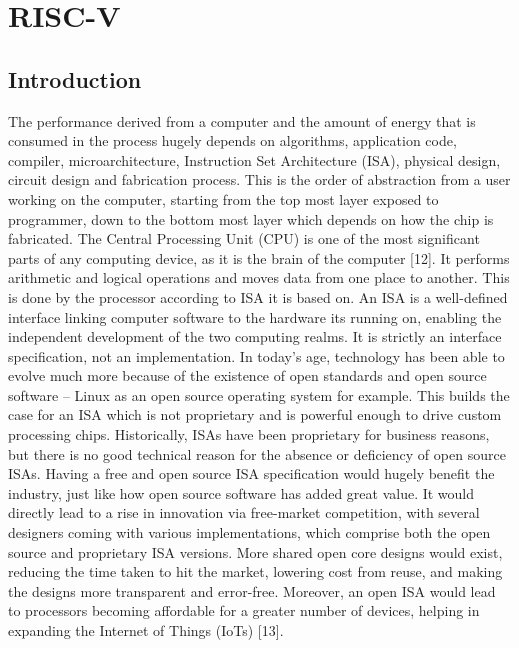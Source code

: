 \chapter{RISC-V}
\label{ch6_riscv}

\section{Introduction}
 \label{sect6_1}
 
The performance derived from a computer and the amount of energy that is consumed in the process hugely depends on algorithms, application code, compiler, microarchitecture, Instruction Set Architecture (ISA), physical design, circuit design and fabrication process. This is the order of abstraction from a user working on the computer, starting from the top most layer exposed to programmer, down to the bottom most layer which depends on how the chip is fabricated. \newline\newline
The Central Processing Unit (CPU) is one of the most significant parts of any computing device, as it is the brain of the computer [12]. It performs arithmetic and logical operations and moves data from one place to another. This is done by the processor according to ISA it is based on. An ISA is a well-defined interface linking computer software to the hardware its running on, enabling the independent development of the two computing realms. It is strictly an interface specification, not an implementation. \newline\newline
In today’s age, technology has been able to evolve much more because of the existence of open standards and open source software – Linux as an open source operating system for example. This builds the case for an ISA which is not proprietary and is powerful enough to drive custom processing chips. \newline\newline
Historically, ISAs have been proprietary for business reasons, but there is no good technical reason for the absence or deficiency of open source ISAs. Having a free and open source ISA specification would hugely benefit the industry, just like how open source software has added great value. It would directly lead to a rise in innovation via free-market competition, with several designers coming with various implementations, which comprise both the open source and proprietary ISA versions. More shared open core designs would exist, reducing the time taken to hit the market, lowering cost from reuse, and making the designs more transparent and error-free. Moreover, an open ISA would lead to processors becoming affordable for a greater number of devices, helping in expanding the Internet of Things (IoTs) [13].

